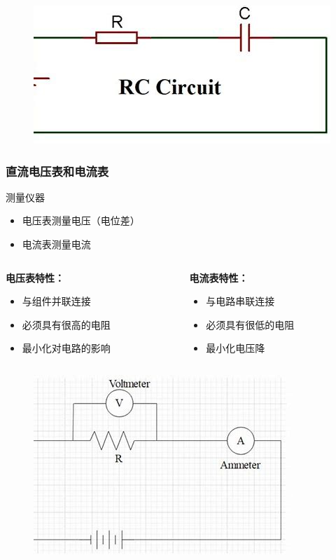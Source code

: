 \documentclass{beamer}
\begin{document}
\begin{frame}{}
    \begin{figure}
        \centering
        \includegraphics[width=1\linewidth]{phys12-circuits-kirchhoffs-junction-rule.jpg}
    \end{figure}
\end{frame}

\begin{frame}
    \frametitle{直流电压表和电流表}
    \begin{block}{测量仪器}
        \begin{itemize}
            \item 电压表测量电压（电位差）
            \item 电流表测量电流
        \end{itemize}
    \end{block}
    \begin{columns}
        \begin{column}{0.5\textwidth}
            \textbf{电压表特性：}
            \begin{itemize}
                \item 与组件并联连接
                \item 必须具有很高的电阻
                \item 最小化对电路的影响
            \end{itemize}
        \end{column}
        \begin{column}{0.5\textwidth}
            \textbf{电流表特性：}
            \begin{itemize}
                \item 与电路串联连接
                \item 必须具有很低的电阻
                \item 最小化电压降
            \end{itemize}
        \end{column}
    \end{columns}
    \begin{figure}
        \centering
        \includegraphics[width=0.3\linewidth]{phys12-circuits-ammeter-voltmeter-connection.jpg}
    \end{figure}
\end{frame}
\end{document}
